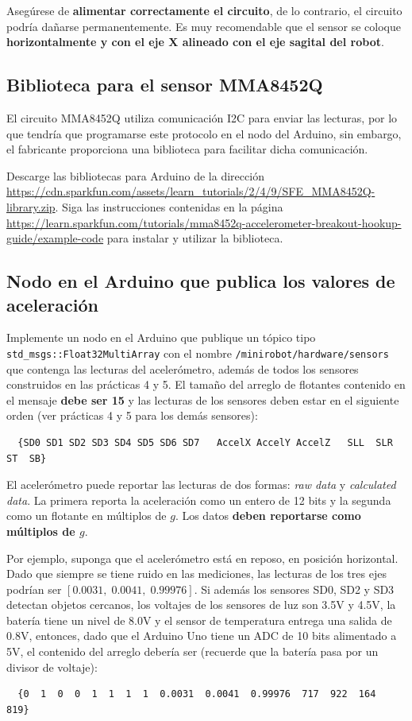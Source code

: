 \documentclass[a4paper,12pt]{article}
\begin{document}
Asegúrese de \textbf{alimentar correctamente el circuito}, de lo contrario, el circuito podría dañarse permanentemente. Es muy recomendable que el sensor se coloque \textbf{horizontalmente y con el eje X alineado con el eje sagital del robot}. 

\subsection{Biblioteca para el sensor MMA8452Q}

El circuito MMA8452Q utiliza comunicación I2C para enviar las lecturas, por lo que tendría que programarse este protocolo en el nodo del Arduino, sin embargo, el fabricante proporciona una biblioteca para facilitar dicha comunicación. 

Descarge las bibliotecas para Arduino de la dirección \url{https://cdn.sparkfun.com/assets/learn_tutorials/2/4/9/SFE_MMA8452Q-library.zip}. Siga las instrucciones contenidas en la página \url{https://learn.sparkfun.com/tutorials/mma8452q-accelerometer-breakout-hookup-guide/example-code} para instalar y utilizar la biblioteca. 

\subsection{Nodo en el Arduino que publica los valores de aceleración}
Implemente un nodo en el Arduino que publique un tópico tipo \texttt{std\_msgs::Float32MultiArray} con el nombre \texttt{/minirobot/hardware/sensors} que contenga las lecturas del acelerómetro, además de todos los sensores construidos en las prácticas 4 y 5. El tamaño del arreglo de flotantes contenido en el mensaje \textbf{debe ser 15} y las lecturas de los sensores deben estar en el siguiente orden (ver prácticas 4 y 5 para los demás sensores): 

\begin{verbatim}
  {SD0 SD1 SD2 SD3 SD4 SD5 SD6 SD7   AccelX AccelY AccelZ   SLL  SLR  ST  SB}
\end{verbatim}

El acelerómetro puede reportar las lecturas de dos formas: \textit{raw data} y \textit{calculated data}. La primera reporta la aceleración como un entero de 12 bits y la segunda como un flotante en múltiplos de $g$. Los datos \textbf{deben reportarse como múltiplos de $g$}.

Por ejemplo, suponga que el acelerómetro está en reposo, en posición horizontal. Dado que siempre se tiene ruido en las mediciones, las lecturas de los tres ejes podrían ser $[0.0031,\;0.0041,\;0.99976]$. Si además los sensores SD0, SD2 y SD3 detectan objetos cercanos, los voltajes de los sensores de luz son 3.5V y 4.5V, la batería tiene un nivel de 8.0V y el sensor de temperatura entrega una salida de 0.8V, entonces, dado que el Arduino Uno tiene un ADC de 10 bits alimentado a 5V, el contenido del arreglo debería ser (recuerde que la batería pasa por un divisor de voltaje):
\begin{verbatim}
  {0  1  0  0  1  1  1  1  0.0031  0.0041  0.99976  717  922  164  819}
\end{verbatim}
\end{document}
